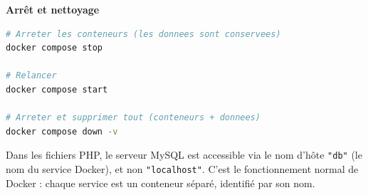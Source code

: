 \documentclass[a4paper,11pt]{article}
\theoremstyle{plain}
\theoremstyle{definition}
\begin{document}
\begin{tcolorbox}[colback=gray!5!white, colframe=gray!60!black, title={Mise en place avec Docker}]
\medskip
\textbf{Arrêt et nettoyage}

\begin{lstlisting}[language=bash,numbers=none]
# Arreter les conteneurs (les donnees sont conservees)
docker compose stop

# Relancer
docker compose start

# Arreter et supprimer tout (conteneurs + donnees)
docker compose down -v
\end{lstlisting}

\medskip
\begin{attention}
Dans les fichiers PHP, le serveur MySQL est accessible via le nom d'hôte \texttt{"db"} (le nom du service Docker), et non \texttt{"localhost"}. C'est le fonctionnement normal de Docker : chaque service est un conteneur séparé, identifié par son nom.
\end{attention}

\end{tcolorbox}

\bigskip


\end{document}
